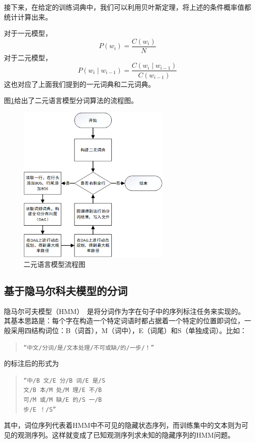 \documentclass[11pt,a4paper]{article}
\begin{document}
	接下来，在给定的训练词典中，我们可以利用贝叶斯定理，将上述的条件概率值都统计计算出来。
	
	对于一元模型，
	\begin{equation}
		P(w_{i})=\frac{C(w_{i})}{N}
	\end{equation}
	对于二元模型，
	\begin{equation}
		P(w_{i} \mid w_{i-1})=\frac{C(w_{i} \mid w_{i-1})}{C(w_{i-1})}
	\end{equation}
	这也对应了上面我们提到的一元词典和二元词典。
	
	图\ref{bigram_flowpic}给出了二元语言模型分词算法的流程图。
	\begin{figure}[htbp]
		\centering
		\includegraphics[width=7.5cm]{bigram.png}
		\caption{二元语言模型流程图}\label{bigram_flowpic}
	\end{figure}
	
	\subsection{基于隐马尔科夫模型的分词}
	隐马尔可夫模型（HMM）~\citep{stanke2003gene}是将分词作为字在句子中的序列标注任务来实现的。其基本思路是：每个字在构造一个特定词语时都占据着一个特定的位置即词位，一般采用四结构词位：B（词首），M（词中），E（词尾）和S（单独成词）。比如：
	\begin{quote}
		\verb|“中文/分词/是/文本处理/不可或缺/的/一步/！”|\\
	\end{quote}
	的标注后的形式为
	\begin{quote}
		\verb|“中/B 文/E 分/B 词/E 是/S |\\
		\verb|文/B 本/M 处/M 理/E 不/B |\\
		\verb|可/M 或/M 缺/E 的/S 一/B |\\
		\verb|步/E ！/S”|\\
	\end{quote}
	其中，词位序列代表着HMM中不可见的隐藏状态序列，而训练集中的文本则为可见的观测序列。这样就变成了已知观测序列求未知的隐藏序列的HMM问题。
	
\end{document}
